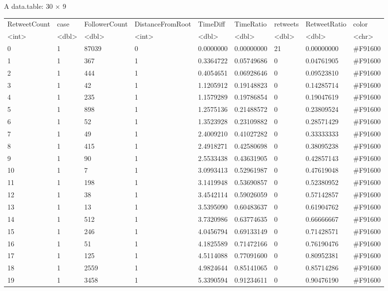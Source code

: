 \documentclass[11pt]{article}
\begin{document}
    A data.table: 30 × 9
\begin{tabular}{lllllllll}
 RetweetCount & case & FollowerCount & DistanceFromRoot & TimeDiff & TimeRatio & retweets & RetweetRatio & color\\
 <int> & <dbl> & <dbl> & <int> & <dbl> & <dbl> & <dbl> & <dbl> & <chr>\\
\hline
	  0 & 1 & 87039 & 0 & 0.0000000 & 0.00000000 & 21 & 0.00000000 & \#F91600\\
	  1 & 1 &   367 & 1 & 0.3364722 & 0.05749686 &  0 & 0.04761905 & \#F91600\\
	  2 & 1 &   444 & 1 & 0.4054651 & 0.06928646 &  0 & 0.09523810 & \#F91600\\
	  3 & 1 &    42 & 1 & 1.1205912 & 0.19148823 &  0 & 0.14285714 & \#F91600\\
	  4 & 1 &   235 & 1 & 1.1579289 & 0.19786854 &  0 & 0.19047619 & \#F91600\\
	  5 & 1 &   898 & 1 & 1.2575136 & 0.21488572 &  0 & 0.23809524 & \#F91600\\
	  6 & 1 &    52 & 1 & 1.3523928 & 0.23109882 &  0 & 0.28571429 & \#F91600\\
	  7 & 1 &    49 & 1 & 2.4009210 & 0.41027282 &  0 & 0.33333333 & \#F91600\\
	  8 & 1 &   415 & 1 & 2.4918271 & 0.42580698 &  0 & 0.38095238 & \#F91600\\
	  9 & 1 &    90 & 1 & 2.5533438 & 0.43631905 &  0 & 0.42857143 & \#F91600\\
	 10 & 1 &     7 & 1 & 3.0993413 & 0.52961987 &  0 & 0.47619048 & \#F91600\\
	 11 & 1 &   198 & 1 & 3.1419948 & 0.53690857 &  0 & 0.52380952 & \#F91600\\
	 12 & 1 &    38 & 1 & 3.4542114 & 0.59026059 &  0 & 0.57142857 & \#F91600\\
	 13 & 1 &    13 & 1 & 3.5395090 & 0.60483637 &  0 & 0.61904762 & \#F91600\\
	 14 & 1 &   512 & 1 & 3.7320986 & 0.63774635 &  0 & 0.66666667 & \#F91600\\
	 15 & 1 &   246 & 1 & 4.0456794 & 0.69133149 &  0 & 0.71428571 & \#F91600\\
	 16 & 1 &    51 & 1 & 4.1825589 & 0.71472166 &  0 & 0.76190476 & \#F91600\\
	 17 & 1 &   125 & 1 & 4.5114088 & 0.77091600 &  0 & 0.80952381 & \#F91600\\
	 18 & 1 &  2559 & 1 & 4.9824644 & 0.85141065 &  0 & 0.85714286 & \#F91600\\
	 19 & 1 &  3458 & 1 & 5.3390594 & 0.91234611 &  0 & 0.90476190 & \#F91600\\

\end{tabular}
\end{document}
